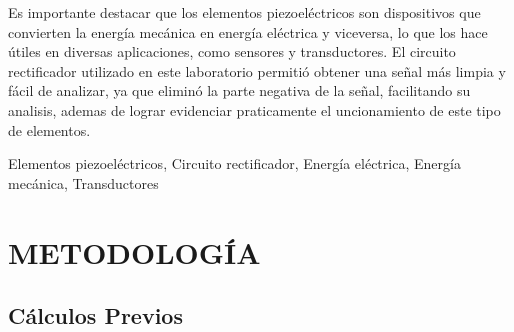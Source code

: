\documentclass[journal,transmag]{IEEEtran}
\begin{document}
Es importante destacar que los elementos piezoeléctricos son dispositivos que convierten la energía mecánica en energía eléctrica y viceversa, lo que los hace útiles en diversas aplicaciones, como sensores y transductores. El circuito rectificador utilizado en este laboratorio permitió obtener una señal más limpia y fácil de analizar, ya que eliminó la parte negativa de la señal, facilitando su analisis, ademas de lograr evidenciar praticamente el uncionamiento de este tipo de elementos. 
\begin{IEEEkeywords}
Elementos piezoeléctricos, Circuito rectificador, Energía eléctrica, Energía mecánica, Transductores
	 	\end{IEEEkeywords}

\section{METODOLOGÍA}

\subsection{Cálculos Previos}
\end{document}
